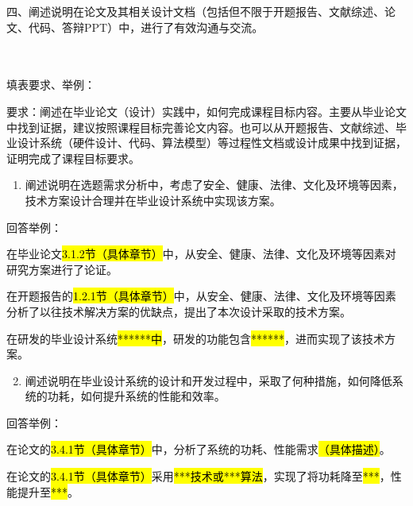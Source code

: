 \documentclass[
]{article}
\begin{document}
{\begin{longtable}[]
{四、阐述说明在论文及其相关设计文档（包括但不限于开题报告、文献综述、论文、代码、答辩PPT）中，进行了有效沟通与交流。} \\
 \\
 \\
\end{longtable}
}

填表要求、举例：

要求：阐述在毕业论文（设计）实践中，如何完成课程目标内容。主要从毕业论文中找到证据，建议按照课程目标完善论文内容。也可以从开题报告、文献综述、毕业设计系统（硬件设计、代码、算法模型）等过程性文档或设计成果中找到证据，证明完成了课程目标要求。

\begin{enumerate}
\item
  阐述说明在选题需求分析中，考虑了安全、健康、法律、文化及环境等因素，技术方案设计合理并在毕业设计系统中实现该方案。
\end{enumerate}

回答举例：

在毕业论文\hl{3.1.2节（具体章节）}中，从安全、健康、法律、文化及环境等因素对研究方案进行了论证。

在开题报告的\hl{1.2.1节（具体章节）}中，从安全、健康、法律、文化及环境等因素分析了以往技术解决方案的优缺点，提出了本次设计采取的技术方案。

在研发的毕业设计系统\hl{******中}，研发的功能包含\hl{******}，进而实现了该技术方案。

\begin{enumerate}
\setcounter{enumi}{1}
\item
  阐述说明在毕业设计系统的设计和开发过程中，采取了何种措施，如何降低系统的功耗，如何提升系统的性能和效率。
\end{enumerate}

回答举例：

在论文的\hl{3.4.1节（具体章节）}中，分析了系统的功耗、性能需求\hl{（具体描述）}。

在论文的\hl{3.4.1节（具体章节）}采用\hl{***技术或***算法}，实现了将功耗降至\hl{***}，性能提升至\hl{***}。
\end{document}

